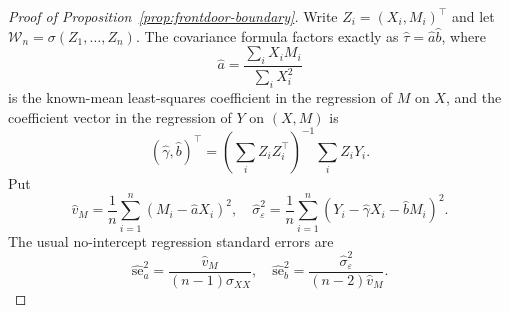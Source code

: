 \documentclass[12pt,a4paper]{article}
\theoremstyle{plain}
\theoremstyle{definition}
\newcommand{\eps}{\varepsilon}
\begin{document}
\begin{proof}[Proof of Proposition~\ref{prop:frontdoor-boundary}]
    Write $Z_i=(X_i,M_i)^\top$ and let $\mathcal{W}_n=\sigma(Z_1,\ldots,Z_n)$.
    The covariance formula factors exactly as $\hat{\tau}=\hat{a}\hat{b}$, where
    \begin{equation*}
        \hat{a}
        =
        \frac{\sum_iX_iM_i}{\sum_iX_i^2}
    \end{equation*}
    is the known-mean least-squares coefficient in the regression of $M$ on $X$, and the coefficient vector in the regression of $Y$ on $(X,M)$ is
    \begin{equation*}
        (\hat{\gamma},\hat{b})^\top
        =
        (\sum_iZ_iZ_i^\top)^{-1}\sum_iZ_iY_i
        .
    \end{equation*}
    Put
    \begin{equation*}
        \hat{v}_M
        =
        \frac{1}{n}\sum_{i=1}^n(M_i-\hat{a}X_i)^2
        ,\quad
        \hat{\sigma}_\eps^2
        =
        \frac{1}{n}\sum_{i=1}^n
        (Y_i-\hat{\gamma} X_i-\hat{b}M_i)^2
        .
    \end{equation*}
    The usual no-intercept regression standard errors are
    \begin{equation}
    \label{eq:frontdoor-regse}
        \widehat{\mathrm{se}}_a^2
        =
        \frac{\hat{v}_M}{(n-1)\hat{\sigma}_{XX}}
        ,\quad
        \widehat{\mathrm{se}}_b^2
        =
        \frac{\hat{\sigma}_\eps^2}{(n-2)\hat{v}_M}
        .
    \end{equation}
    

\end{proof}
\end{document}
